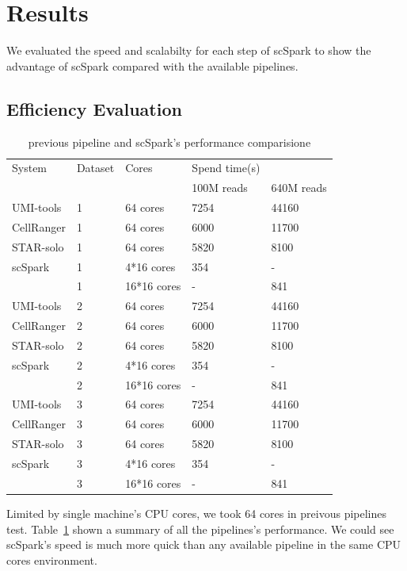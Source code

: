 \documentclass[10pt,journal,compsoc]{IEEEtran}
\begin{document}
\section{Results}
We evaluated the speed and scalabilty for each step of scSpark to show the advantage of scSpark compared with the available pipelines. 

\subsection{Efficiency Evaluation}
\begin{table}
	\centering
	\caption{previous pipeline and scSpark's performance comparisione}\label{tab1}
	\resizebox{0.45\textwidth}{!} {
	\begin{tabular}{l | l | l | l  l}
		\hline
		System & Dataset & Cores & Spend time(s) \\
		& & & 100M reads & 640M reads  \\
		\hline
		UMI-tools & 1 & 64 cores & 7254 & 44160 \\
		CellRanger & 1 & 64 cores & 6000 & 11700 \\
		STAR-solo & 1 & 64 cores &  5820 & 8100 \\
		scSpark & 1 & 4*16 cores & 354 & - \\
		& 1 & 16*16 cores & - & 841 \\
		UMI-tools & 2 & 64 cores & 7254 & 44160 \\
		CellRanger & 2 & 64 cores & 6000 & 11700 \\
		STAR-solo & 2 & 64 cores &  5820 & 8100 \\
		scSpark & 2 & 4*16 cores & 354 & - \\
		& 2 & 16*16 cores & - & 841 \\
		UMI-tools & 3 & 64 cores & 7254 & 44160 \\
		CellRanger & 3 & 64 cores & 6000 & 11700 \\
		STAR-solo & 3 & 64 cores &  5820 & 8100 \\
		scSpark & 3 & 4*16 cores & 354 & - \\
		& 3 & 16*16 cores & - & 841 \\
		\hline
	\end{tabular}
	}
\end{table}
Limited by single machine's CPU cores, we took 64 cores in preivous pipelines test.
Table~\ref{tab1} shown a summary of all the pipelines's performance.
We could see scSpark's speed is much more quick than any available pipeline in the same CPU cores environment.
\end{document}

